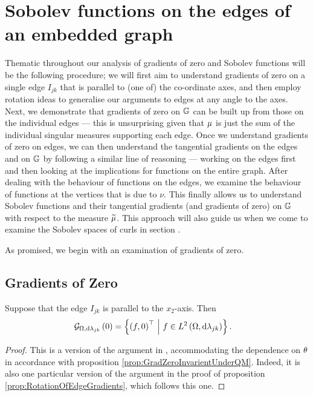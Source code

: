 \section{Sobolev functions on the edges of an embedded graph} \label{ssec:ScalarSobSpaces}


Thematic throughout our analysis of gradients of zero and Sobolev functions will be the following procedure; we will first aim to understand gradients of zero on a single edge $I_{jk}$ that is parallel to (one of) the co-ordinate axes, and then employ rotation ideas to generalise our arguments to edges at any angle to the axes.
Next, we demonstrate that gradients of zero on $\mathbb{G}$ can be built up from those on the individual edges --- this is unsurprising given that $\mu$ is just the sum of the individual singular measures supporting each edge.
Once we understand gradients of zero on edges, we can then understand the tangential gradients on the edges and on $\mathbb{G}$ by following a similar line of reasoning --- working on the edges first and then looking at the implications for functions on the entire graph.
After dealing with the behaviour of functions on the edges, we examine the behaviour of functions at the vertices that is due to $\nu$.
This finally allows us to understand Sobolev functions and their tangential gradients (and gradients of zero) on $\mathbb{G}$ with respect to the measure $\widetilde{\mu}$.
This approach will also guide us when we come to examine the Sobolev spaces of curls in section .

As promised, we begin with an examination of gradients of zero. 
\subsection{Gradients of Zero} \label{ssec:muGradZero}
\begin{prop} \label{prop:GradZeroParallelZhikov}
	Suppose that the edge $I_{jk}$ is parallel to the $x_2$-axis.
	Then 
	\begin{align*}
		\mathcal{G}_{ \Omega, \mathrm{d}\lambda_{jk}}\left( 0 \right) &= 
		\left\{  \left( f,0 \right)^\top	\ \middle\vert \  f\in L^{2}\left( \Omega,\mathrm{d}\lambda_{jk} \right)  \right\}.
	\end{align*}
\end{prop}
\begin{proof}
	This is a version of the argument in \cite[Section~3.1]{zhikov2000extension}, accommodating the dependence on $\theta$ in accordance with proposition \ref{prop:GradZeroInvarientUnderQM}.
	Indeed, it is also one particular version of the argument in the proof of proposition \ref{prop:RotationOfEdgeGradients}, which follows this one.
\end{proof}

